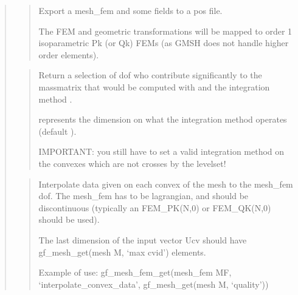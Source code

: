 \documentclass[a4paper,11pt,english]{sphinxmanual}
\begin{document}
\begin{quote}
\sphinxAtStartPar
{}
\begin{quote}

\sphinxAtStartPar
Export a mesh\_fem and some fields to a pos file.

\sphinxAtStartPar
The FEM and geometric transformations will be mapped to order 1
isoparametric Pk (or Qk) FEMs (as GMSH does not handle higher
order elements).
\end{quote}

\sphinxAtStartPar
{}
\begin{quote}

\sphinxAtStartPar
Return a selection of dof who contribute significantly to the
mass\sphinxhyphen{}matrix that would be computed with  and the integration
method .

\sphinxAtStartPar
{} represents the dimension on what the integration method
operates (default ).

\sphinxAtStartPar
IMPORTANT: you still have to set a valid integration method on
the convexes which are not crosses by the levelset!
\end{quote}

\sphinxAtStartPar
{}
\begin{quote}

\sphinxAtStartPar
Interpolate data given on each convex of the mesh to the mesh\_fem dof.
The mesh\_fem has to be lagrangian, and should be discontinuous (typically
an FEM\_PK(N,0) or FEM\_QK(N,0) should be used).

\sphinxAtStartPar
The last dimension of the input vector Ucv should have
gf\_mesh\_get(mesh M, ‘max cvid’) elements.

\sphinxAtStartPar
Example of use: gf\_mesh\_fem\_get(mesh\_fem MF, ‘interpolate\_convex\_data’, gf\_mesh\_get(mesh M, ‘quality’))
\end{quote}

\sphinxAtStartPar
{}
\begin{quote}


\end{quote}
\end{quote}
\end{document}
